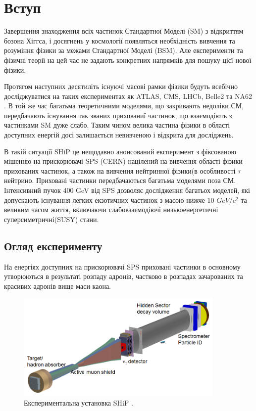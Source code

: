 \section{Вступ}
	
	Завершення знаходження всіх частинок Стандартної Моделі (SM) з відкриттям бозона Хіггса, і досягнень у космології  появляться необхідність вивчення та розуміння фізики за межами Стандартної Моделі (BSM). Але експерименти та фізичні теорії на цей час не задають конкретних напрямків для пошуку цієї нової фізики.
			
	Протягом наступних десятиліть існуючі масові рамки фізики будуть всебічно досліджуватися на таких експериментах як ATLAS, CMS, LHCb, Belle2 та NA62 \cite{NA62_TDR}. В той же час багатьма теоретичними моделями, що закривають недоліки СМ, передбачають існування так званих прихованиї частинок, що взаємодіють з частинками SM дуже слабо. Таким чином велика частина фізики в області доступних енергій досі залишається невивченою і відкрита для досліджень.
	
	В такій ситуації SHiP це нещодавно анонсований експеримент з фіксованою мішенню на прискорювачі SPS (CERN) націлений на вивчення 	області фізики прихованих частинок, а також на вивчення нейтринної фізики(в особливості $\tau$ нейтрино. Приховані частинки передбачаються багатьма моделями поза СМ. Інтенсивний пучок 400 GeV від SPS дозволяє дослідження багатьох моделей, які допускають існування легких екзотичних частинок з масою нижче 10 $GeV/c^2$ та великим часом життя, включаючи слабовзаємодіючі низькоенергетичні суперсиметричні(SUSY) стани.	
		
	\subsection{Огляд експерименту}
	
	На енергіях доступних на прискорювачі SPS приховані частинки в основному утворюються в результаті розпаду адронів, частково в розпадах зачарованих та красивих адронів вище маси каона.

	\begin{figure}[!h]
	\centering
	\includegraphics[width=0.9\textwidth]{introduction/SHiP-facility-overview}
	\caption{Експериментальна установка SHiP \cite{ship_TP}. }
	\label{fig:detector-overwiew}
	\end{figure}
	
